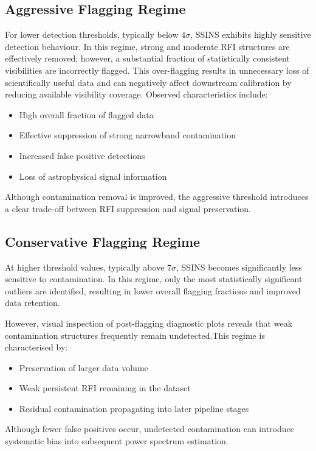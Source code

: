 \documentclass{article}
\begin{document}
\subsection{Aggressive Flagging Regime}
For lower detection thresholds, typically below $4\sigma$, SSINS exhibits highly sensitive detection behaviour. In this regime, strong and moderate RFI structures are effectively removed; however, a substantial fraction of statistically consistent visibilities are incorrectly flagged. This over-flagging results in unnecessary loss of scientifically useful data and can negatively affect downstream calibration by reducing available visibility coverage. Observed characteristics include:
\begin{itemize}
\item High overall fraction of flagged data
\item Effective suppression of strong narrowband contamination
\item Increased false positive detections
\item Loss of astrophysical signal information
\end{itemize}
Although contamination removal is improved, the aggressive threshold introduces a clear trade-off between RFI suppression and signal preservation.

\subsection{Conservative Flagging Regime}
At higher threshold values, typically above $7\sigma$, SSINS becomes significantly less sensitive to contamination. In this regime, only the most statistically significant outliers are identified, resulting in lower overall flagging fractions and improved data retention.

However, visual inspection of post-flagging diagnostic plots reveals that weak contamination structures frequently remain undetected.This regime is characterised by:
\begin{itemize}
Lower fraction of flagged visibilities
\item Preservation of larger data volume
\item Weak persistent RFI remaining in the dataset
\item Residual contamination propagating into later pipeline stages
\end{itemize}
Although fewer false positives occur, undetected contamination can introduce systematic bias into subsequent power spectrum estimation.
\end{document}

